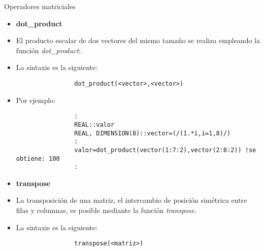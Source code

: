 \begin{frame}[fragile]{Operadores matriciales} 
    \begin{itemize}[<+(0)->]
        \item [] \textbf{dot\_product}
        \item El producto escalar de dos vectores del mismo tamaño se realiza empleando la función \emph{dot\_product}:.
        \item La sintaxis es la siguiente: \\
            \vspace{0.1cm}
            \begin{verbatim}
                dot_product(<vector>,<vector>)
            \end{verbatim}
        \item [] Por ejemplo:
            \vspace{0.1cm}
            \begin{verbatim}
                :
                REAL::valor
                REAL, DIMENSION(8)::vector=(/(1.*i,i=1,8)/)
                :
                valor=dot_product(vector(1:7:2),vector(2:8:2)) !se obtiene: 100
                :
            \end{verbatim}    
        \item [] \textbf{transpose}
        \item La transposición de una matriz, el intercambio de posición simétrica entre filas y columnas, es posible mediante la función \emph{transpose}.
        \item La sintaxis es la siguiente: \\
            \vspace{0.1cm}
            \begin{verbatim}
                transpose(<matriz>)
            \end{verbatim}
    \end{itemize}
\end{frame}



